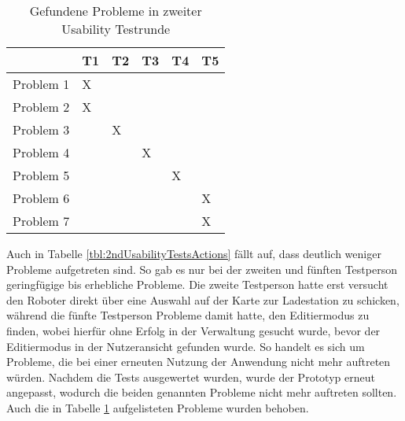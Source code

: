 \begin{table}[H]
    \caption{Gefundene Probleme in zweiter Usability Testrunde}\label{tbl:2ndUsabilityTestsProblems}
    \begin{tabular}{l|l|l|l|l|l}
                    & T1    & T2    & T3    & T4    & T5    \\ \hline
        Problem 1   & X     &       &       &       &       \\
        Problem 2   & X     &       &       &       &       \\
        Problem 3   &       & X     &       &       &       \\
        Problem 4   &       &       & X     &       &       \\
        Problem 5   &       &       &       & X     &       \\
        Problem 6   &       &       &       &       & X     \\
        Problem 7   &       &       &       &       & X     \\
    \end{tabular}    
\end{table}

Auch in Tabelle \ref{tbl:2ndUsabilityTestsActions} fällt auf, dass deutlich weniger Probleme aufgetreten sind. So gab es nur bei der zweiten und fünften Testperson geringfügige bis erhebliche Probleme. Die zweite Testperson hatte erst versucht den Roboter direkt über eine Auswahl auf der Karte zur Ladestation zu schicken, während die fünfte Testperson Probleme damit hatte, den Editiermodus zu finden, wobei hierfür ohne Erfolg in der Verwaltung gesucht wurde, bevor der Editiermodus in der Nutzeransicht gefunden wurde. So handelt es sich um Probleme, die bei einer erneuten Nutzung der Anwendung nicht mehr auftreten würden. Nachdem die Tests ausgewertet wurden, wurde der Prototyp erneut angepasst, wodurch die beiden genannten Probleme nicht mehr auftreten sollten. Auch die in Tabelle \ref{tbl:2ndUsabilityTestsProblems} aufgelisteten Probleme wurden behoben.

